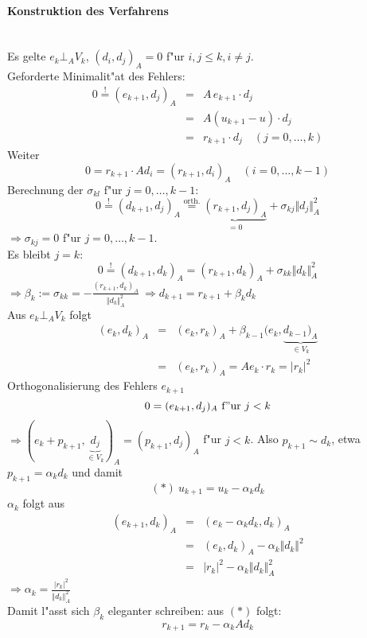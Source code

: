 \documentclass{scrartcl}
\begin{document}
\paragraph{Konstruktion des Verfahrens} \ \\
Es gelte $e_k \bot_A V_k$, $(d_i, d_j)_A = 0$ f"ur $i,j \leq k, i \neq j$. \\
Geforderte Minimalit"at des Fehlers:
\begin{eqnarray*}
0 \stackrel{!}{=} (e_{k+1}, d_j)_A & = & A \, e_{k+1} \cdot d_j \\
& = & A(u_{k+1} - u) \cdot d_j \\
& = & r_{k+1} \cdot d_j \quad (j=0, \ldots, k)
\end{eqnarray*}
Weiter
$$ 0 = r_{k+1} \cdot Ad_i = (r_{k+1}, d_i)_A \quad (i=0, \ldots, k-1)$$
Berechnung der $\sigma_{kl}$ f"ur $j=0, \ldots, k-1$:
$$ 0 \stackrel{!}{=} (d_{k+1}, d_j)_A \stackrel{\mathrm{orth.}}{=} \underbrace{(r_{k+1}, d_j)_A}_{=0} + \sigma_{kj} \Vert d_j \Vert_A^2$$
$\Rightarrow \sigma_{kj} = 0$ f"ur $j = 0, \ldots, k-1$. \\
Es bleibt $j=k$:
$$ 0 \stackrel{!}{=} (d_{k+1}, d_k )_A = (r_{k+1}, d_k)_A + \sigma_{kk} \Vert d_k \Vert_A^2$$
$\Rightarrow \beta_k := \sigma_{kk} = -\frac{ (r_{k+1}, d_k)_A}{\Vert d_k \Vert_A^2} \ \Rightarrow d_{k+1} = r_{k+1} + \beta_k d_k$ \\
Aus $e_k \bot_A V_k$ folgt 
\begin{eqnarray*}
(e_k, d_k)_A & = & (e_k, r_k)_A + \beta_{k-1} (e_k, \underbrace{d_{k-1})_A}_{\in V_k} \\
& = & (e_k, r_k)_A = A e_k \cdot r_k = \vert r_k \vert ^2
\end{eqnarray*}
Orthogonalisierung des Fehlers $e_{k+1}$
$$0 = (e_{k+1}, d_j)_A \ \mathrm{f"ur \ } j<k$$
$\Rightarrow (e_k + p_{k+1}, \underbrace{d_j}_{\in V_k})_A = (p_{k+1}, d_j)_A$ f"ur $j<k$. Also $p_{k+1} \sim d_k$, etwa $p_{k+1} = \alpha_k d_k$ und damit
$$ (*) \ u_{k+1} = u_k - \alpha_k d_k$$
$\alpha_k$ folgt aus
\begin{eqnarray*}
(e_{k+1}, d_k)_A & = & (e_k - \alpha_k d_k, d_k)_A \\
& = & (e_k, d_k)_A - \alpha_k \Vert d_k \Vert^2 \\
& = & \vert r_k \vert ^2 - \alpha_k \Vert d_k \Vert_A^2
\end{eqnarray*}
$\Rightarrow \alpha_k = \frac{ \vert r_k \vert ^2 }{ \Vert d_k \Vert_A^2}$ \\
Damit l"asst sich $\beta_k$ eleganter schreiben: aus $(*)$ folgt:
$$r_{k+1} = r_k - \alpha_k A d_k$$
\end{document}
